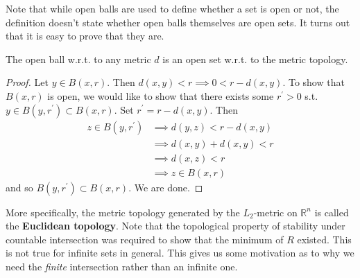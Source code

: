 \documentclass{article}
\begin{document}
    Note that while open balls are used to define whether a set is open or not, the definition doesn't state whether open balls themselves are open sets. It turns out that it is easy to prove that they are. 
    
    \begin{corollary}
      The open ball w.r.t. to any metric $d$ is an open set w.r.t. to the metric topology. 
    \end{corollary}
    \begin{proof}
      Let $y \in B(x, r)$. Then $d(x, y) < r \implies 0 < r - d(x, y)$. To show that $B(x, r)$ is open, we would like to show that there exists some $r^\prime > 0$ s.t. $y \in B(y, r^\prime) \subset B(x, r)$. Set $r^\prime = r - d(x, y)$. Then 
      \begin{align}
        z \in B(y, r^\prime) & \implies d(y, z) < r - d(x, y) \\
                             & \implies d(x, y) + d(x, y) < r \\
                             & \implies d(x, z) < r \\
                             & \implies z \in B(x, r)
      \end{align} 
      and so $B(y, r^\prime) \subset B(x, r)$. We are done. 
    \end{proof}

    More specifically, the metric topology generated by the $L_2$-metric on $\mathbb{R}^n$ is called the \textbf{Euclidean topology}. Note that the topological property of stability under countable intersection was required to show that the minimum of $R$ existed. This is not true for infinite sets in general. This gives us some motivation as to why we need the \textit{finite} intersection rather than an infinite one. 
    
\end{document}
